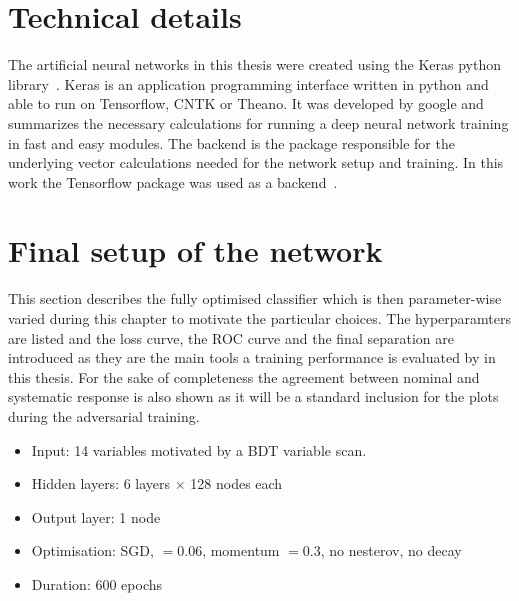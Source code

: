 \section{Technical details}
\label{sec:technicals}

The artificial neural networks in this thesis were created using the Keras python library~\cite{chollet2015keras}.
Keras is an application programming interface written in python and able to run on Tensorflow, CNTK or Theano. It was developed by google and summarizes the necessary calculations for running a deep neural network training in fast and easy modules.
The backend is the package responsible for the underlying vector calculations needed for the network setup and training. In this work the Tensorflow package was used as a backend~\cite{tensorflow2015-whitepaper}.

\section{Final setup of the network}
\label{sec:simplesetup}

This section describes the fully optimised classifier which is then parameter-wise varied during this chapter to motivate the particular choices.
The hyperparamters are listed and the loss curve, the ROC curve and the final separation are introduced as they are the main tools a training performance is evaluated by in this thesis. For the sake of completeness the agreement between nominal and systematic response is also shown as it will be a standard inclusion for the plots during the adversarial training.


\begin{itemize}
\item Input: \num{14} variables motivated by a BDT variable scan.
\item Hidden layers: \num{6} \ELU layers $\times$ \num{128} nodes each
\item Output layer: \num{1} \SIGMOID node
\item Optimisation: SGD, \LEARNINGR $=0.06$, momentum $=0.3$, no nesterov, no decay
\item Duration: 600 epochs
\end{itemize}

